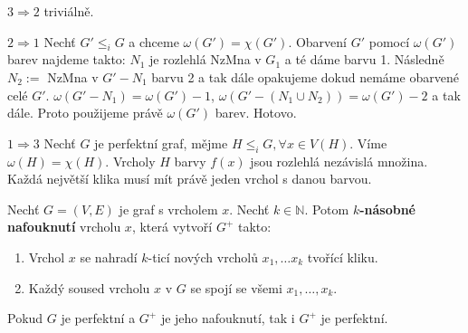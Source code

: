 \begin{dukaz}
	$3 \Rightarrow 2$ triviálně.
	
	$2 \Rightarrow 1$ Nechť $G' \leq_{i} G$ a chceme $\omega(G') = \chi(G')$. Obarvení $G'$ pomocí $\omega(G')$ barev najdeme takto: $N_{1}$ je rozlehlá NzMna v $G_{1}$ a té dáme barvu 1. Následně $N_{2} :=$ NzMna v $G' - N_{1}$ barvu 2 a tak dále opakujeme dokud nemáme obarvené celé $G'$. $\omega(G' - N_{1}) = \omega(G') -1$, $\omega(G' - (N_{1} \cup N_{2})) = \omega(G') -2$ a tak dále. Proto použijeme právě $\omega(G')$ barev. Hotovo.
	
	$1 \Rightarrow 3$ Nechť $G$ je perfektní graf, mějme $H \leq_{i} G, \forall x \in V(H)$. Víme $\omega(H) = \chi(H)$. Vrcholy $H$ barvy $f(x)$ jsou rozlehlá nezávislá množina. Každá největší klika musí mít právě jeden vrchol s danou barvou.
\end{dukaz}

\begin{definice}
	Nechť $G= (V,E)$ je graf s vrcholem $x$. Nechť $k \in \mathbb{N}$. Potom \textbf{$k$-násobné nafouknutí} vrcholu $x$, která vytvoří $G^{+}$ takto:
	
	\begin{enumerate}
		\item Vrchol $x$ se nahradí $k$-ticí nových vrcholů $x_{1}, \dots x_{k}$ tvořící kliku.
		\item Každý soused vrcholu $x$ v $G$ se spojí se všemi $x_{1}, \dots, x_{k}$.
	\end{enumerate}
\end{definice}


\begin{lemma}[2]
	Pokud $G$ je perfektní a $G^{+}$ je jeho nafouknutí, tak i $G^{+}$ je perfektní.
\end{lemma}


